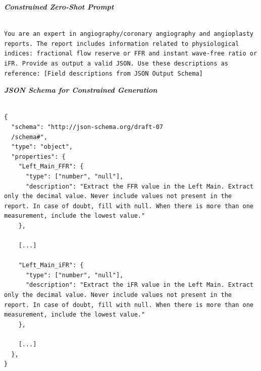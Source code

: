 \begin{center}
\footnotesize 
\begin{minipage}{0.49\textwidth}
\textit{\textbf{Constrained Zero-Shot Prompt}}
\begin{Verbatim}[breaklines=true, breaksymbolleft={}, breaksymbolright={}]

You are an expert in angiography/coronary angiography and angioplasty reports. The report includes information related to physiological indices: fractional flow reserve or FFR and instant wave-free ratio or iFR. Provide as output a valid JSON. Use these descriptions as reference: [Field descriptions from JSON Output Schema]

\end{Verbatim}
\end{minipage}
\end{center}


\begin{center}
\footnotesize 
\begin{minipage}{0.45\textwidth}
\textit{\textbf{JSON Schema for Constrained Generation}}

\begin{Verbatim}[breaklines=true, breaksymbolleft={}, breaksymbolright={}]

{
  "schema": "http://json-schema.org/draft-07
  /schema#",
  "type": "object",
  "properties": {
    "Left_Main_FFR": {
      "type": ["number", "null"],
      "description": "Extract the FFR value in the Left Main. Extract only the decimal value. Never include values not present in the report. In case of doubt, fill with null. When there is more than one measurement, include the lowest value."
    },

    [...]

    "Left_Main_iFR": {
      "type": ["number", "null"],
      "description": "Extract the iFR value in the Left Main. Extract only the decimal value. Never include values not present in the report. In case of doubt, fill with null. When there is more than one measurement, include the lowest value."
    },

    [...]
  },
}
\end{Verbatim}
\end{minipage}
\end{center}